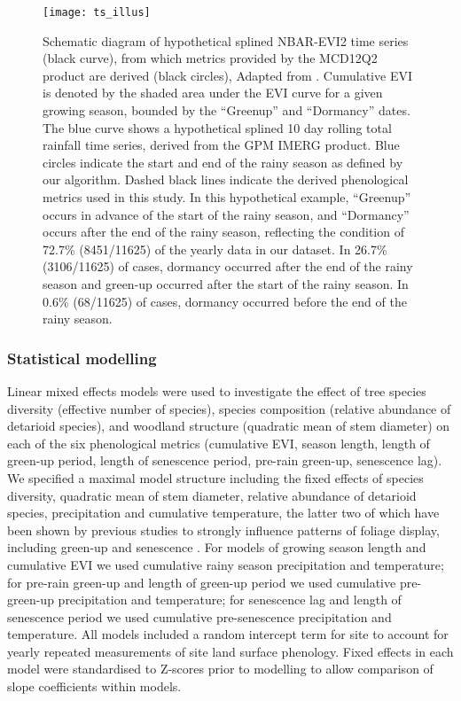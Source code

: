 \documentclass[11pt,a4paper]{article}
\begin{document}
\begin{figure}[H]
\centering
	\texttt{[image: ts\_illus]}
	\caption{Schematic diagram of hypothetical splined NBAR-EVI2 time series
		(black curve), from which metrics provided by the MCD12Q2 product are
		derived (black circles), Adapted from \citet{Gray2022}. Cumulative EVI
		is denoted by the shaded area under the EVI curve for a given growing
		season, bounded by the ``Greenup'' and ``Dormancy'' dates. The blue
		curve shows a hypothetical splined 10 day rolling total rainfall time
		series, derived from the GPM IMERG product. Blue circles indicate the
		start and end of the rainy season as defined by our algorithm. Dashed
		black lines indicate the derived phenological metrics used in this
		study. In this hypothetical example, ``Greenup'' occurs in advance of
		the start of the rainy season, and ``Dormancy'' occurs after the end of
		the rainy season, reflecting the condition of 72.7\%
		(\num{8451}/\num{11625}) of the yearly data in our dataset. In 26.7\%
		(\num{3106}/\num{11625}) of cases, dormancy occurred after the end of
		the rainy season and green-up occurred after the start of the rainy
		season. In 0.6\% (\num{68}/\num{11625}) of cases, dormancy occurred before 
		the end of the rainy season.}
	\label{ts_illus}
\end{figure}

\subsubsection{Statistical modelling}

Linear mixed effects models were used to investigate the effect of tree species
diversity (effective number of species), species composition (relative
abundance of detarioid species), and woodland structure (quadratic mean of stem
diameter) on each of the six phenological metrics (cumulative EVI, season
length, length of green-up period, length of senescence period, pre-rain
green-up, senescence lag). We specified a maximal model structure including the
fixed effects of species diversity, quadratic mean of stem diameter, relative
abundance of detarioid species, precipitation and cumulative temperature, the
latter two of which have been shown by previous studies to strongly influence
patterns of foliage display, including green-up and senescence
\citep{Whitecross2017, Adole2019}. For models of growing season length and
cumulative EVI we used cumulative rainy season precipitation and temperature;
for pre-rain green-up and length of green-up period we used cumulative
pre-green-up precipitation and temperature; for senescence lag and length of
senescence period we used cumulative pre-senescence precipitation and
temperature. All models included a random intercept term for site to account
for yearly repeated measurements of site land surface phenology. Fixed effects
in each model were standardised to Z-scores prior to modelling to allow
comparison of slope coefficients within models. 
\end{document}
